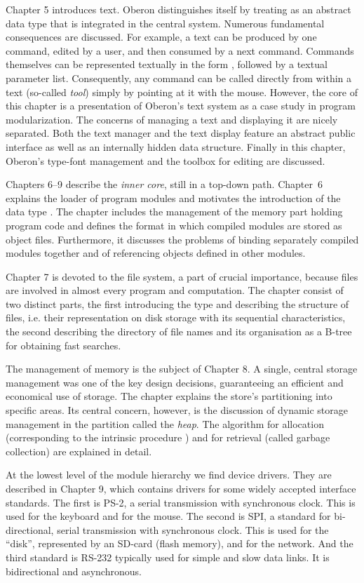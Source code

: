 Chapter 5 introduces text. Oberon distinguishes itself by treating
 as an abstract data type that is integrated in the central
system. Numerous fundamental consequences are discussed. For example,
a text can be produced by one command, edited by a user, and then
consumed by a next command. Commands themselves can be represented
textually in the form , followed by a textual parameter
list. Consequently, any command can be called directly from within a
text (so-called \emph{tool}) simply by pointing at it with the
mouse. However, the core of this chapter is a presentation of Oberon's
text system as a case study in program modularization. The concerns of
managing a text and displaying it are nicely separated. Both the text
manager and the text display feature an abstract public interface as
well as an internally hidden data structure. Finally in this chapter,
Oberon's type-font management and the toolbox for editing are
discussed.

Chapters 6--9 describe the \emph{inner core}, still in a top-down
path. Chapter~6 explains the loader of program modules and motivates
the introduction of the data type . The chapter includes the
management of the memory part holding program code and defines the
format in which compiled modules are stored as object
files. Furthermore, it discusses the problems of binding separately
compiled modules together and of referencing objects defined in other
modules.

Chapter 7 is devoted to the file system, a part of crucial importance,
because files are involved in almost every program and
computation. The chapter consist of two distinct parts, the first
introducing the type  and describing the structure of files,
i.e. their representation on disk storage with its sequential
characteristics, the second describing the directory of file names and
its organisation as a B-tree for obtaining fast searches.

The management of memory is the subject of Chapter 8. A single,
central storage management was one of the key design decisions,
guaranteeing an efficient and economical use of storage. The chapter
explains the store's partitioning into specific areas. Its central
concern, however, is the discussion of dynamic storage management in
the partition called the \emph{heap}. The algorithm for allocation
(corresponding to the intrinsic procedure ) and for retrieval
(called garbage collection) are explained in detail.

At the lowest level of the module hierarchy we find device
drivers. They are described in Chapter 9, which contains drivers for
some widely accepted interface standards. The first is PS-2, a serial
transmission with synchronous clock. This is used for the keyboard and
for the mouse. The second is SPI, a standard for bi-directional,
serial transmission with synchronous clock. This is used for the
``disk'', represented by an SD-card (flash memory), and for the
network. And the third standard is RS-232 typically used for simple
and slow data links. It is bidirectional and asynchronous.

